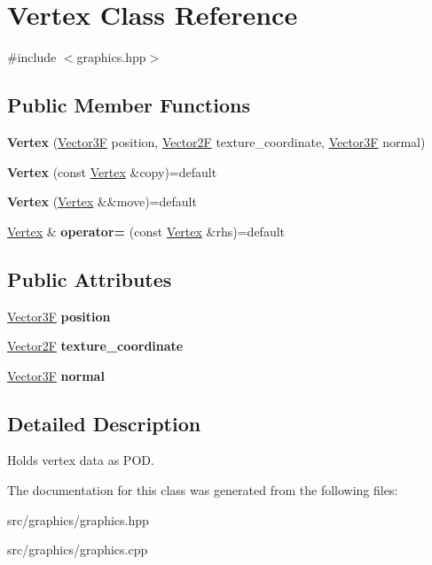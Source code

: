 \hypertarget{class_vertex}{}\section{Vertex Class Reference}
\label{class_vertex}


{\ttfamily \#include $<$graphics.\+hpp$>$}

\subsection*{Public Member Functions}
\begin{DoxyCompactItemize}
\item 
\mbox{\label{class_vertex_ae4559785564472d10e8d1841d2eb7623}} 
{\bfseries Vertex} (\mbox{\hyperlink{class_vector3}{Vector3F}} position, \mbox{\hyperlink{class_vector2}{Vector2F}} texture\+\_\+coordinate, \mbox{\hyperlink{class_vector3}{Vector3F}} normal)
\item 
\mbox{\label{class_vertex_adbc4aa5ad91d60baaf5d4b2074422a45}} 
{\bfseries Vertex} (const \mbox{\hyperlink{class_vertex}{Vertex}} \&copy)=default
\item 
\mbox{\label{class_vertex_afb30eddb5b108ecae9f85162774704da}} 
{\bfseries Vertex} (\mbox{\hyperlink{class_vertex}{Vertex}} \&\&move)=default
\item 
\mbox{\label{class_vertex_a82c319c7333510f07d9e9562f8e75fb2}} 
\mbox{\hyperlink{class_vertex}{Vertex}} \& {\bfseries operator=} (const \mbox{\hyperlink{class_vertex}{Vertex}} \&rhs)=default
\end{DoxyCompactItemize}
\subsection*{Public Attributes}
\begin{DoxyCompactItemize}
\item 
\mbox{\label{class_vertex_aa4ab18178c5139414ff693b2b7b9b9e2}} 
\mbox{\hyperlink{class_vector3}{Vector3F}} {\bfseries position}
\item 
\mbox{\label{class_vertex_af45cec25c3780af10c8675c931ae29fa}} 
\mbox{\hyperlink{class_vector2}{Vector2F}} {\bfseries texture\+\_\+coordinate}
\item 
\mbox{\label{class_vertex_a3bf768cdf45ec52969a5cae3966681d5}} 
\mbox{\hyperlink{class_vector3}{Vector3F}} {\bfseries normal}
\end{DoxyCompactItemize}


\subsection{Detailed Description}
Holds vertex data as P\+OD. 

The documentation for this class was generated from the following files\+:\begin{DoxyCompactItemize}
\item 
src/graphics/graphics.\+hpp\item 
src/graphics/graphics.\+cpp\end{DoxyCompactItemize}
